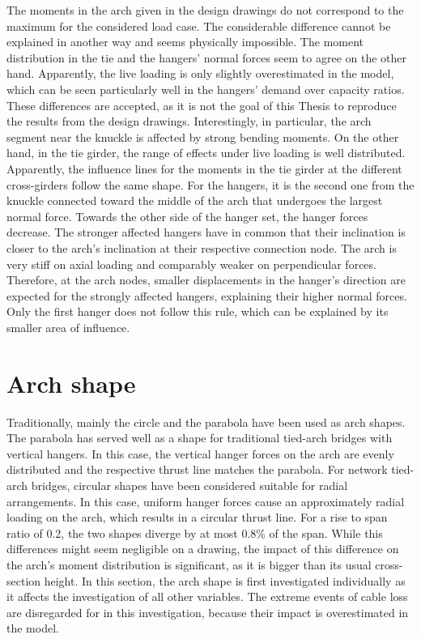 The moments in the arch given in the design drawings do not correspond to the maximum for the considered load case. The considerable difference cannot be explained in another way and seems physically impossible. The moment distribution in the tie and the hangers' normal forces seem to agree on the other hand. Apparently, the live loading is only slightly overestimated in the model, which can be seen particularly well in the hangers' demand over capacity ratios. These differences are accepted, as it is not the goal of this Thesis to reproduce the results from the design drawings. Interestingly, in particular, the arch segment near the knuckle is affected by strong bending moments. On the other hand, in the tie girder, the range of effects under live loading is well distributed. Apparently, the influence lines for the moments in the tie girder at the different cross-girders follow the same shape. For the hangers, it is the second one from the knuckle connected toward the middle of the arch that undergoes the largest normal force. Towards the other side of the hanger set, the hanger forces decrease. The stronger affected hangers have in common that their inclination is closer to the arch's inclination at their respective connection node. The arch is very stiff on axial loading and comparably weaker on perpendicular forces. Therefore, at the arch nodes, smaller displacements in the hanger's direction are expected for the strongly affected hangers, explaining their higher normal forces. Only the first hanger does not follow this rule, which can be explained by its smaller area of influence. \medskip

\newpage
\section{Arch shape}
Traditionally, mainly the circle and the parabola have been used as arch shapes. The parabola has served well as a shape for traditional tied-arch bridges with vertical hangers. In this case, the vertical hanger forces on the arch are evenly distributed and the respective thrust line matches the parabola. For network tied-arch bridges, circular shapes have been considered suitable for radial arrangements. In this case, uniform hanger forces cause an approximately radial loading on the arch, which results in a circular thrust line. For a rise to span ratio of 0.2, the two shapes diverge by at most 0.8\% of the span. While this differences might seem negligible on a drawing, the impact of this difference on the arch's moment distribution is significant, as it is bigger than its usual cross-section height. In this section, the arch shape is first investigated individually as it affects the investigation of all other variables. The extreme events of cable loss are disregarded for in this investigation, because their impact is overestimated in the model. \medskip

